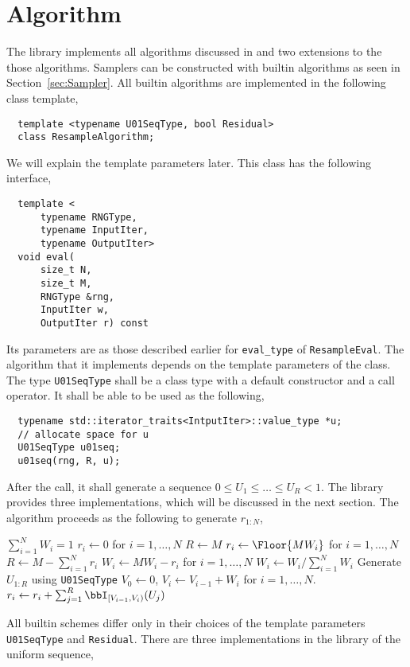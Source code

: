 \section{Algorithm}
\label{sec:Algorithm}

The library implements all algorithms discussed in \textcite{Douc:2005wa} and
two extensions to the those algorithms. Samplers can be constructed with
builtin algorithms as seen in Section~\ref{sec:Sampler}. All builtin algorithms
are implemented in the following class template,
\begin{Verbatim}
  template <typename U01SeqType, bool Residual>
  class ResampleAlgorithm;
\end{Verbatim}
We will explain the template parameters later. This class has the following
interface,
\begin{Verbatim}
  template <
      typename RNGType,
      typename InputIter,
      typename OutputIter>
  void eval(
      size_t N,
      size_t M,
      RNGType &rng,
      InputIter w,
      OutputIter r) const
\end{Verbatim}
Its parameters are as those described earlier for \verb|eval_type| of
\verb|ResampleEval|. The algorithm that it implements depends on the template
parameters of the class. The type \verb|U01SeqType| shall be a class type with
a default constructor and a call operator. It shall be able to be used as the
following,
\begin{Verbatim}
  typename std::iterator_traits<IntputIter>::value_type *u;
  // allocate space for u
  U01SeqType u01seq;
  u01seq(rng, R, u);
\end{Verbatim}
After the call, it shall generate a sequence $0 \le U_1 \le \dots\le U_R < 1$.
The library provides three implementations, which will be discussed in the next
section. The algorithm proceeds as the following to generate $r_{1:N}$,
\begin{algorithmic}
  \REQUIRE $\sum_{i=1}^N W_i = 1$
  \STATE $r_i \leftarrow 0$ for $i = 1,\dots,N$
  \STATE $R \leftarrow M$
  \ELSE
  \STATE $r_i \leftarrow \Floor{MW_i}$ for $i = 1,\dots,N$
  \STATE $R \leftarrow M - \sum_{i=1}^N r_i$
  \STATE $W_i \leftarrow MW_i - r_i$ for $i = 1,\dots,N$
  \STATE $W_i \leftarrow W_i / \sum_{i=1}^NW_i$
  \ENDIF
  \STATE Generate $U_{1:R}$ using \verb|U01SeqType|
  \STATE $V_0 \leftarrow 0$, $V_i \leftarrow V_{i - 1} + W_i$ for $i =
  1,\dots,N$.
  \STATE $r_i \leftarrow r_i + \sum_{j=1}^R\bbI_{[V_{i-1},V_i)}(U_j)$
\end{algorithmic}
All builtin schemes differ only in their choices of the template parameters
\verb|U01SeqType| and \verb|Residual|. There are three implementations in the
library of the uniform sequence,

